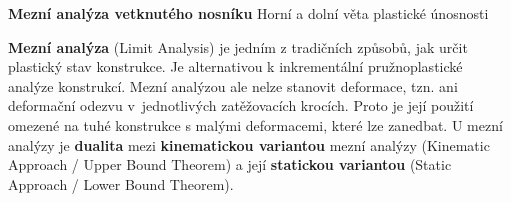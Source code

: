 \documentclass[10pt]{article}
\begin{document}
\begin{tcolorbox}[colback=navy,colframe=navy,boxrule=0pt,arc=0mm,height=20mm,valign=center,left=7mm,right=7mm]
{\color{white}\fontsize{27}{30}\selectfont\bfseries Mezní analýza vetknutého nosníku}\hfill
{\color{white}\large Horní a dolní věta plastické únosnosti}
\end{tcolorbox}
\vspace{4mm}

\begin{tcolorbox}[colback=navy!5,colframe=navy!35,height=25mm,valign=center]
   \textbf{Mezní analýza} (Limit Analysis) je jedním z tradičních
   způsobů, jak určit plastický stav konstrukce. Je alternativou k inkrementální pružnoplastické analýze konstrukcí. Mezní analýzou ale nelze stanovit deformace, tzn. ani deformační odezvu v~jednotlivých zatěžovacích krocích. Proto je její použití omezené na tuhé konstrukce s malými deformacemi, které lze zanedbat. U mezní analýzy je \textbf{dualita} mezi \textbf{kinematickou variantou} mezní analýzy (Kinematic Approach / Upper Bound Theorem) a její \textbf{statickou variantou} (Static Approach / Lower Bound Theorem). 
\end{tcolorbox}
\end{document}
